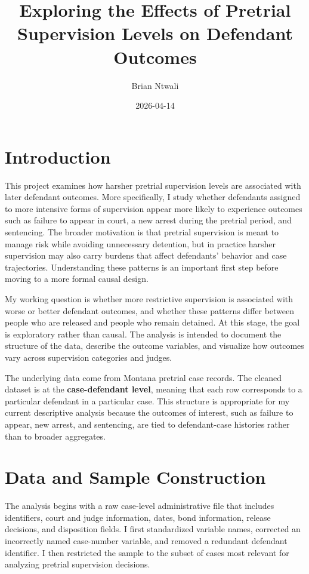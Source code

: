 \documentclass[
  11pt,
]{article}
\title{Exploring the Effects of Pretrial Supervision Levels on Defendant
Outcomes}
\author{Brian Ntwali}
\date{2026-04-14}
\begin{document}
\maketitle

\section{Introduction}\label{introduction}

This project examines how harsher pretrial supervision levels are
associated with later defendant outcomes. More specifically, I study
whether defendants assigned to more intensive forms of supervision
appear more likely to experience outcomes such as failure to appear in
court, a new arrest during the pretrial period, and sentencing. The
broader motivation is that pretrial supervision is meant to manage risk
while avoiding unnecessary detention, but in practice harsher
supervision may also carry burdens that affect defendants' behavior and
case trajectories. Understanding these patterns is an important first
step before moving to a more formal causal design.

My working question is whether more restrictive supervision is
associated with worse or better defendant outcomes, and whether these
patterns differ between people who are released and people who remain
detained. At this stage, the goal is exploratory rather than causal. The
analysis is intended to document the structure of the data, describe the
outcome variables, and visualize how outcomes vary across supervision
categories and judges.

The underlying data come from Montana pretrial case records. The cleaned
dataset is at the \textbf{case-defendant level}, meaning that each row
corresponds to a particular defendant in a particular case. This
structure is appropriate for my current descriptive analysis because the
outcomes of interest, such as failure to appear, new arrest, and
sentencing, are tied to defendant-case histories rather than to broader
aggregates.

\section{Data and Sample
Construction}\label{data-and-sample-construction}

The analysis begins with a raw case-level administrative file that
includes identifiers, court and judge information, dates, bond
information, release decisions, and disposition fields. I first
standardized variable names, corrected an incorrectly named case-number
variable, and removed a redundant defendant identifier. I then
restricted the sample to the subset of cases most relevant for analyzing
pretrial supervision decisions.
\end{document}
